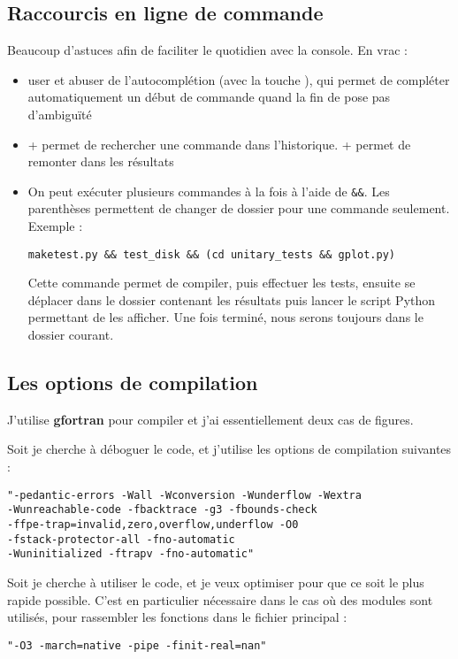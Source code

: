 \subsection{Raccourcis en ligne de commande}
Beaucoup d'astuces afin de faciliter le quotidien avec la console. En vrac : 
\begin{itemize}
\item user et abuser de l'autocomplétion (avec la touche ), qui permet de compléter automatiquement un début de commande quand la fin de pose pas d'ambiguïté
\item {} +  permet de rechercher une commande dans l'historique.  +  permet de remonter dans les résultats
\item On peut exécuter plusieurs commandes à la fois à l'aide de \verb|&&|. Les parenthèses permettent de changer de dossier pour une commande seulement. Exemple : \\
\begin{verbatim}
maketest.py && test_disk && (cd unitary_tests && gplot.py)
\end{verbatim}

Cette commande permet de compiler, puis effectuer les tests, ensuite se déplacer dans le dossier contenant les résultats puis lancer le script Python permettant de les afficher. Une fois terminé, nous serons toujours dans le dossier courant.
\end{itemize}

\subsection{Les options de compilation}
J'utilise \textbf{gfortran} pour compiler et j'ai essentiellement deux cas de figures. 

Soit je cherche à déboguer le code, et j'utilise les options de compilation suivantes : 
\begin{verbatim}
"-pedantic-errors -Wall -Wconversion -Wunderflow -Wextra 
-Wunreachable-code -fbacktrace -g3 -fbounds-check
-ffpe-trap=invalid,zero,overflow,underflow -O0
-fstack-protector-all -fno-automatic 
-Wuninitialized -ftrapv -fno-automatic"
\end{verbatim}

Soit je cherche à utiliser le code, et je veux optimiser pour que ce soit le plus rapide possible. C'est en particulier nécessaire dans le cas où des modules sont utilisés, pour rassembler les fonctions dans le fichier principal : 
\begin{verbatim}
"-O3 -march=native -pipe -finit-real=nan"
\end{verbatim}



